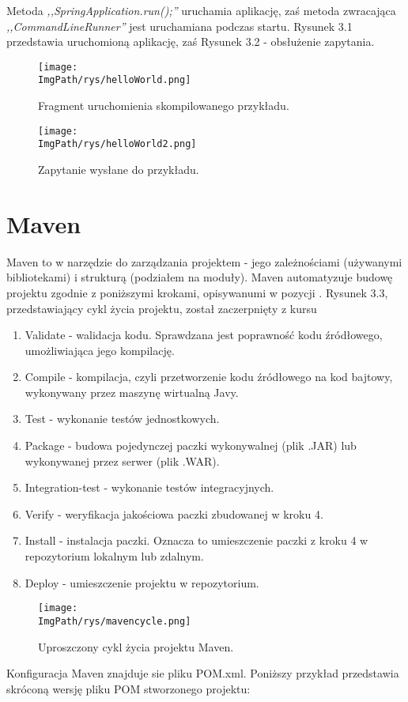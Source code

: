 \documentclass[a4paper,12pt,twoside,openany]{report}
\newcommand{\ImgPath}{.}
\begin{document}
Metoda \textit{,,SpringApplication.run();''} uruchamia aplikację, zaś metoda zwracająca \textit{,,CommandLineRunner''} jest uruchamiana podczas startu. Rysunek 3.1 przedstawia uruchomioną aplikację, zaś Rysunek 3.2 - obsłużenie zapytania.
		\begin{figure}[!htbp]
			\begin{center}
				\centering
				\texttt{[image: \\ImgPath/rys/helloWorld.png]}
			\end{center}
			\caption{Fragment uruchomienia skompilowanego przykładu.}
			\label{UMLTS}
		\end{figure}
				\begin{figure}[!htbp]
					\begin{center}
						\centering
						\texttt{[image: \\ImgPath/rys/helloWorld2.png]}
					\end{center}
					\caption{Zapytanie wysłane do przykładu.}
					\label{UMLTS}
				\end{figure}
				

\section{Maven}
Maven to w narzędzie do zarządzania projektem - jego zależnościami (używanymi bibliotekami) i strukturą (podziałem na moduły). Maven automatyzuje budowę projektu zgodnie z poniższymi krokami, opisywanumi w pozycji \cite{Maven}. Rysunek 3.3, przedstawiający cykl życia projektu, został zaczerpnięty z kursu \cite{KobietyDoKodu}
\begin{enumerate}
	\item Validate - walidacja kodu. Sprawdzana jest poprawność kodu źródłowego, umożliwiająca jego kompilację.
	\item Compile - kompilacja, czyli przetworzenie kodu źródłowego na kod bajtowy, wykonywany przez maszynę wirtualną Javy.
	\item Test - wykonanie testów jednostkowych.
	\item Package - budowa pojedynczej paczki wykonywalnej (plik .JAR) lub wykonywanej przez serwer (plik .WAR).
	\item Integration-test - wykonanie testów integracyjnych.
	\item Verify - weryfikacja jakościowa paczki zbudowanej w kroku 4.
	\item Install - instalacja paczki. Oznacza to umieszczenie paczki z kroku 4 w repozytorium lokalnym lub zdalnym.
	\item Deploy - umieszczenie projektu w repozytorium.
\end{enumerate}
				\begin{figure}[!htbp]
					\begin{center}
						\centering
						\texttt{[image: \\ImgPath/rys/mavencycle.png]}
					\end{center}
					\caption{Uproszczony cykl życia projektu Maven.}
					\label{UMLTS}
				\end{figure}
Konfiguracja Maven znajduje sie pliku POM.xml. Poniższy przykład przedstawia skróconą wersję pliku POM stworzonego projektu:
\end{document}
